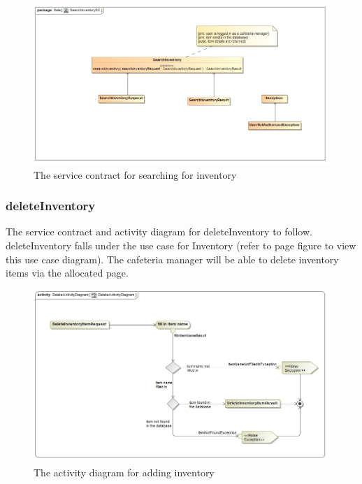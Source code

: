 \documentclass[a4paper,12pt]{report}
\begin{document}
\begin{figure}[H]
	\centering
	\includegraphics[width=1.0\textwidth]{../images/SearchInventorySC.jpg}
	\caption{The service contract for searching for inventory}
\end{figure}

\subsubsection{deleteInventory}
The service contract and activity diagram for deleteInventory to follow. deleteInventory falls under the use case for Inventory (refer to page   figure   to view this use case diagram). The cafeteria manager will be able to delete inventory items via the allocated page.
\begin{figure}[H]
  \centering
    \includegraphics[width=1.0\textwidth]{../images/DeleteActivityDiagram.jpg}
    \caption{The activity diagram for adding inventory} 
\end{figure}
\end{document}
